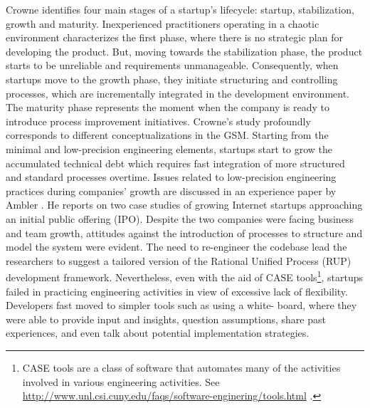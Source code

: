 \documentclass[10pt,journal,letterpaper,compsoc]{IEEEtran}
\begin{document}
Crowne \cite{Crowne2002} identifies four main stages of a startup's lifecycle:
startup, stabilization, growth and maturity. Inexperienced practitioners
operating in a chaotic environment characterizes the first phase, where there is
no strategic plan for developing the product. But, moving towards the
stabilization phase, the product starts to be unreliable and requirements
unmanageable. Consequently, when startups move to the growth phase, they
initiate structuring and controlling processes, which are incrementally
integrated in the development environment. The maturity phase represents the
moment when the company is ready to introduce process improvement initiatives.
Crowne's study profoundly corresponds to different conceptualizations in the
GSM. Starting from the minimal and low-precision engineering elements, startups
start to grow the accumulated technical debt which requires fast integration of
more structured and standard processes overtime. Issues related to low-precision
engineering practices during companies' growth  are discussed in an experience
paper by Ambler \cite{Ambler2002}. He reports on  two case studies of growing
Internet startups approaching an initial public offering (IPO). %
Despite the two companies were facing business and team growth, attitudes  
against the introduction of processes to structure and model the system were  
evident. The need to re-engineer the codebase lead the researchers to suggest a 
tailored version of the Rational Unified Process (RUP)
development framework. Nevertheless, even with the aid of CASE  
tools\footnote{CASE tools are a class of software that automates many of the  
activities involved in various engineering activities.
See  \url{http://www.unl.csi.cuny.edu/faqs/software-enginering/tools.html} .},
startups failed in practicing engineering activities in view of excessive lack
of  flexibility. Developers fast moved to simpler tools such as using a white-
board,  where they were able to provide input and insights, question
assumptions, share  past experiences, and even talk about potential
implementation strategies.  
\end{document}
